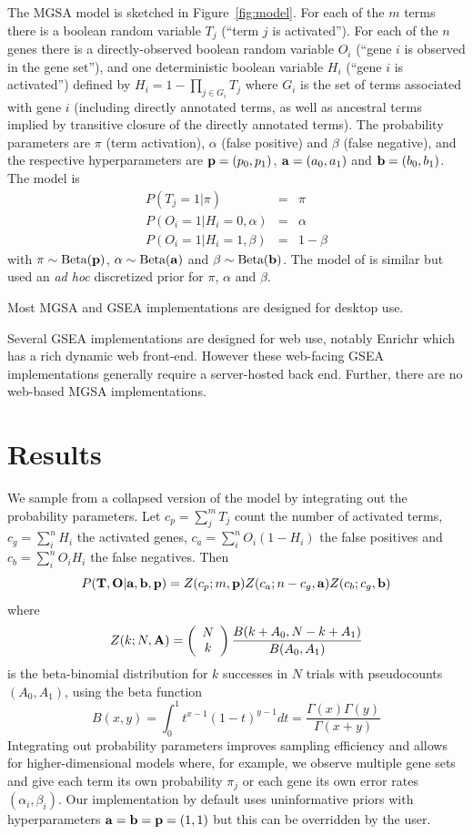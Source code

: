 The MGSA model is sketched in Figure~\ref{fig:model}.
For each of the $m$ terms there
is a boolean random variable
$T_j$ (``term $j$ is activated'').
For each of the $n$ genes there is a directly-observed boolean random variable
$O_i$ (``gene $i$ is observed in the gene set''),
and one deterministic boolean variable
$H_i$ (``gene $i$ is activated'')
defined by $H_i = 1 - \prod_{j \in G_i} T_j$
where $G_i$ is the set of terms associated with gene $i$
(including directly annotated terms, as well as ancestral terms implied by transitive closure of the directly annotated terms).
The probability parameters are $\pi$ (term activation), $\alpha$ (false positive) and $\beta$ (false negative),
and the respective hyperparameters are ${\bf p}=(p_0,p_1)$, ${\bf a}=(a_0,a_1)$ and ${\bf b}=(b_0,b_1)$.
The model is
\begin{eqnarray*}
P(T_j=1|\pi) & = & \pi \\
P(O_i=1|H_i=0,\alpha) & = & \alpha \\
P(O_i=1|H_i=1,\beta) & = & 1-\beta
\end{eqnarray*}
with
$\pi \sim \mbox{Beta}({\bf p})$,
$\alpha \sim \mbox{Beta}({\bf a})$ and
$\beta \sim \mbox{Beta}({\bf b})$.
The model of \cite{pmid20172960} is similar but used an
{\em ad hoc} discretized prior for $\pi$, $\alpha$ and $\beta$.

Most MGSA and GSEA implementations are designed for desktop use.

Several GSEA implementations are designed for web use, notably Enrichr \cite{pmid23586463,pmid25971742,pmid27141961}
which has a rich dynamic web front-end.
However these web-facing GSEA implementations generally require a server-hosted back end.
Further, there are no web-based MGSA implementations.

\section*{Results}

We sample from a collapsed version of the model by integrating out the probability parameters.
Let $c_p = \sum_j^m T_j$ count the number of activated terms,
$c_g = \sum_i^n H_i$ the activated genes,
$c_a = \sum_i^n O_i(1-H_i)$ the false positives and
$c_b = \sum_i^n O_i H_i$ the false negatives.
Then
\[
P({\bf T},{\bf O}|{\bf a},{\bf b},{\bf p}) =
Z(c_p;m,{\bf p})
Z(c_a;n-c_g,{\bf a})
Z(c_b;c_g,{\bf b})
\]
where
\[
Z(k;N,{\bf A}) =
\left( \begin{array}{c} N \\ k \end{array} \right)
\frac{B(k+A_0,N-k+A_1)}{B(A_0,A_1)}
\]
is the beta-binomial distribution for $k$ successes in $N$ trials with pseudocounts $(A_0,A_1)$,
using the beta function
\[
B(x,y) = \int_0^1 t^{x-1}(1-t)^{y-1} dt = \frac{\Gamma(x)\Gamma(y)}{\Gamma(x+y)}
\]
Integrating out probability parameters improves sampling efficiency
and allows for higher-dimensional models where, for example, we observe multiple gene sets
and give each term its own probability $\pi_j$
or each gene its own error rates $(\alpha_i, \beta_i)$.
Our implementation by default uses uninformative priors with hyperparameters ${\bf a}={\bf b}={\bf p}=(1,1)$
but this can be overridden by the user.

